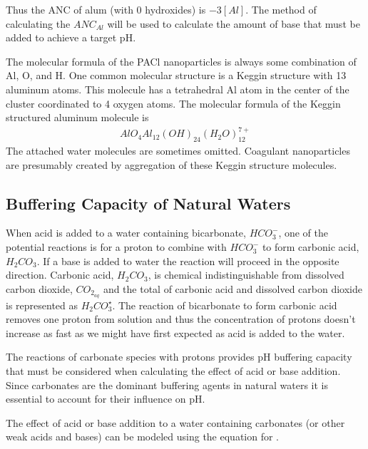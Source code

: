 \documentclass[letterpaper,10pt,english]{sphinxmanual}
\begin{document}
Thus the ANC of alum (with 0 hydroxides) is \(-3[Al]\). The method of calculating the \(ANC_{Al}\) will be used to calculate the amount of base that must be added to achieve a target pH.

The molecular formula of the PACl nanoparticles is always some combination of Al, O, and H. One common molecular structure is a Keggin structure with 13 aluminum atoms. This molecule has a tetrahedral Al atom in the center of the cluster coordinated to 4 oxygen atoms. The molecular formula of the Keggin structured aluminum molecule is
\begin{equation}\label{equation:Rapid_Mix/RM_Intro:Rapid_Mix/RM_Intro:4}
\begin{split}AlO_4Al_{12}(OH)_{24}(H_2O)_{12}^{7+}\end{split}
\end{equation}
The attached water molecules are sometimes omitted. Coagulant nanoparticles are presumably created by aggregation of these Keggin structure molecules.


\subsection{Buffering Capacity of Natural Waters}
\label{\detokenize{Rapid_Mix/RM_Intro:buffering-capacity-of-natural-waters}}\label{\detokenize{Rapid_Mix/RM_Intro:heading-buffering-capacity-of-natural-waters}}
When acid is added to a water containing bicarbonate, \(HCO_3^-\), one of the potential reactions is for a proton to combine with \(HCO_3^-\) to form carbonic acid, \({H_2}CO_3\). If a base is added to water the reaction will proceed in the opposite direction. Carbonic acid, \({H_2}CO_3\), is chemical indistinguishable from dissolved carbon dioxide, \(CO_{2_{aq}}\) and the total of carbonic acid and dissolved carbon dioxide is represented as \({H_2}CO_3^{\star}\). The reaction of bicarbonate to form carbonic acid removes one proton from solution and thus the concentration of protons doesn’t increase as fast as we might have first expected as acid is added to the water.

The reactions of carbonate species with protons provides pH buffering capacity that must be considered when calculating the effect of acid or base addition. Since carbonates are the dominant buffering agents in natural waters it is essential to account for their influence on pH.

The effect of acid or base addition to a water containing carbonates (or other weak acids and bases) can be modeled using the equation for {\hyperref[\detokenize{Rapid_Mix/RM_Derivations:heading-acid-neutralizing-capacity-anc-or-alkalinity}]{}}.
\end{document}
